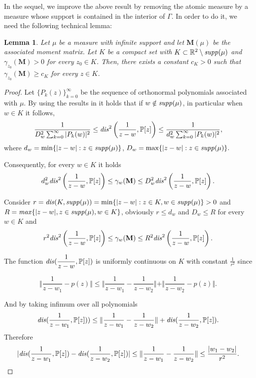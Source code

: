 \documentclass[12pt]{amsart}
\theoremstyle{definition}
\theoremstyle{plain}
\newtheorem{lem}{Lemma}
\theoremstyle{remark}
\begin{document}
\noindent In the sequel, we improve the above result by removing the atomic measure by a measure whose support is contained in the interior of $\Gamma$. In order to do it, we need the following technical lemma:

\begin{lem} Let $\mu$ be a measure with infinite  support and let $\mathbf{M}(\mu)$ be the associated moment matrix. Let $K$ be a compact set with  $K \subset \mathbb{R}^{2}\setminus {\it supp}(\mu)$ and $\gamma_{z_0}(\mathbf{M})>0$ for every $z_0\in K$. Then, there exists a constant $c_{K}>0$
such that $\gamma_{z_0}(\mathbf{M})\geq c_{K}$ for every $z\in K$. 
\end{lem} 





\begin{proof}   Let  $\{P_{k}(z)\}_{k=0}^{\infty}$ be  the sequence of orthonormal polynomials associated with $\mu$.  By using the results in \cite{EGT1} it holds that if 
$w \notin {\it supp}(\mu)$, in particular when $w\in K$ it follows,  
$$
\dfrac{1}{D_{w}^2\sum_{k=0}^{\infty} \vert P_k(w)\vert^2} \leq {\it dis}^2 \left( \dfrac{1}{z-w}, \mathbb{P}[z] \right)
 \leq \dfrac{1}{d_{w}^2\sum_{k=0}^{\infty} \vert P_k(w)\vert^2},
$$
\noindent where $d_{w}=\min \{ \vert z - w \vert: z\in {\it supp}(\mu)\}$, $D_{w}= \max \{ \vert z - w \vert: z\in {\it supp}(\mu)\}.$

\noindent Consequently, for every $w \in K$ it holds 
$$
d_{w}^{2} {\it dis}^2 \left( \dfrac{1}{z-w}, \mathbb{P}[z] \right) \leq \gamma_{w}(\mathbf{M}) \leq D_{w}^{2}{\it dis}^2 \left( \dfrac{1}{z-w}, \mathbb{P}[z] \right). 
$$

\noindent Consider $r={\it dis}(K,{\it supp}(\mu))= \min \{ \vert z-w\vert : z\in K, w\in {\it supp}(\mu)\}>0$ and  $R={\it max} \{ \vert z-w \vert , z\in {\it supp}(\mu), w\in K \}$,  obviously $r\leq d_{w}$  and $D_{w} \leq R$ for every $w\in K$ and 
$$
r^{2} {\it dis}^2 \left( \dfrac{1}{z-w}, \mathbb{P}[z] \right) \leq \gamma_{w}(\mathbf{M}) \leq R^{2}{\it dis}^2 \left( \dfrac{1}{z-w}, \mathbb{P}[z] \right).
$$

\noindent The  function ${\it dis}(\dfrac{1}{z-w},\mathbb{P}[z])$ is uniformly continuous on $K$ with constant  $\frac{1}{r^2}$ since  

$$
\Vert  \dfrac{1}{z-w_1} -p(z) \Vert \leq \Vert \dfrac{1}{z-w_1}-
\dfrac{1}{z-w_2}\Vert + \Vert \dfrac{1}{z-w_2}-p(z) \Vert .
$$

\noindent And by taking infimum over all polynomials  
$$
{\it dis}(\dfrac{1}{z-w_1}, \mathbb{P}[z])) \leq  \Vert \dfrac{1}{z-w_1}-
\dfrac{1}{z-w_2}\Vert + {\it dis}( \dfrac{1}{z-w_2},\mathbb{P}[z]).
$$
\noindent Therefore 
$$
\vert {\it dis}(\dfrac{1}{z-w_1}, \mathbb{P}[z]) - {\it dis}(\dfrac{1}{z-w_2}, \mathbb{P}[z]) \vert \leq \Vert \dfrac{1}{z-w_1}-\dfrac{1}{z-w_2}\Vert \leq \dfrac{\vert w_1-w_2\vert}{r^2}.
$$


\end{proof}
\end{document}

